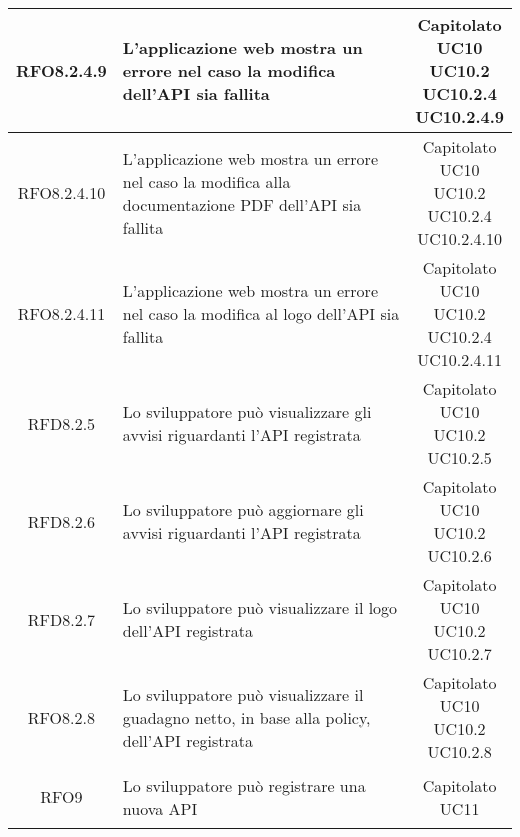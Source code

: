 \begin{longtable}{|c|p{8cm}|c|}
\hypertarget{RFO8.2.4.9}{RFO8.2.4.9} & L'applicazione web mostra un errore nel caso la modifica dell'API sia fallita & \makecell*{Capitolato\\UC10\\UC10.2\\UC10.2.4\\UC10.2.4.9} \\
\hline
\hypertarget{RFO8.2.4.10}{RFO8.2.4.10} & L'applicazione web mostra un errore nel caso la modifica alla documentazione PDF dell'API sia fallita & \makecell*{Capitolato\\UC10\\UC10.2\\UC10.2.4\\UC10.2.4.10} \\
\hline
\hypertarget{RFO8.2.4.11}{RFO8.2.4.11} & L'applicazione web mostra un errore nel caso la modifica al logo dell'API sia fallita & \makecell*{Capitolato\\UC10\\UC10.2\\UC10.2.4\\UC10.2.4.11} \\
\hline

\hypertarget{RFD8.2.5}{RFD8.2.5} & Lo sviluppatore può visualizzare gli avvisi riguardanti l'API registrata & \makecell*{Capitolato\\UC10\\UC10.2\\UC10.2.5} \\
\hline
\hypertarget{RFD8.2.6}{RFD8.2.6} & Lo sviluppatore può aggiornare gli avvisi riguardanti l'API registrata & \makecell*{Capitolato\\UC10\\UC10.2\\UC10.2.6} \\
\hline
\hypertarget{RFD8.2.7}{RFD8.2.7} & Lo sviluppatore può visualizzare il logo dell'API registrata & \makecell*{Capitolato\\UC10\\UC10.2\\UC10.2.7} \\
\hline
\hypertarget{RFO8.2.8}{RFO8.2.8} & Lo sviluppatore può visualizzare il guadagno netto, in base alla policy, dell'API registrata & \makecell*{Capitolato\\UC10\\UC10.2\\UC10.2.8} \\
\hline

\hypertarget{RFO9}{RFO9} & Lo sviluppatore può registrare una nuova API & \makecell*{Capitolato\\UC11} \\
\hline


\end{longtable}

